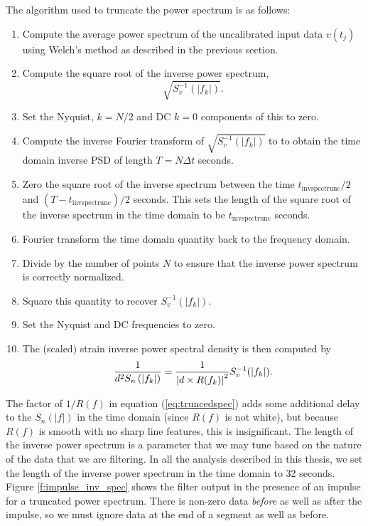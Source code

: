 The algorithm used to truncate the power spectrum is as follows:
\begin{enumerate}
\item Compute the average power spectrum of the uncalibrated input data
$v(t_j)$ using Welch's method as described in the previous section.
\item Compute the square root of the inverse power spectrum,
\begin{equation}
\sqrt{S^{-1}_v(|f_k|)}.
\end{equation}
\item Set the Nyquist, $k = N/2$ and DC $k = 0$ components of this to zero.
\item Compute the inverse Fourier transform of $\sqrt{S^{-1}_v(|f_k|)}$ to to
obtain the time domain inverse PSD of length $T = N\Delta t$ seconds.  \item
Zero the square root of the inverse spectrum between the time
$t_\mathrm{invspectrunc}/2$ and $(T-t_\mathrm{invspectrunc})/2$
seconds. This sets the length of the square root of the inverse spectrum in
the time domain to be $t_\mathrm{invspectrunc}$ seconds.
\item Fourier transform the time domain quantity back to the frequency domain.
\item Divide by the number of points $N$ to ensure that the inverse power
spectrum is correctly normalized.
\item Square this quantity to recover $S^{-1}_v(|f_k|)$.
\item Set the Nyquist and DC frequencies to zero.
\item The (scaled) strain inverse power spectral density is then computed by
\begin{equation}
\frac{1}{d^2S_n\left(\left|f_{k}\right|\right)} = \frac{1}{\left|d \times R(f_k)\right|^2} S^{-1}_v(|f_k|).
\label{eq:truncedspec}
\end{equation}
\end{enumerate}
The factor of $1/R(f)$ in equation (\ref{eq:truncedspec}) adds some additional
delay to the $S_n(|f|)$ in the time domain (since $R(f)$ is not white), but
because $R(f)$ is smooth with no sharp line features, this is insignificant.
The length of the inverse power spectrum is a parameter that we may tune based
on the nature of the data that we are filtering. In all the analysis described
in this thesis, we set the length of the inverse power spectrum in the time
domain to 32 seconds.  Figure \ref{f:impulse_inv_spec} shows the filter output
in the presence of an impulse for a truncated power spectrum. There is
non-zero data \emph{before} as well as after the impulse, so we must ignore
data at the end of a segment as well as before.

